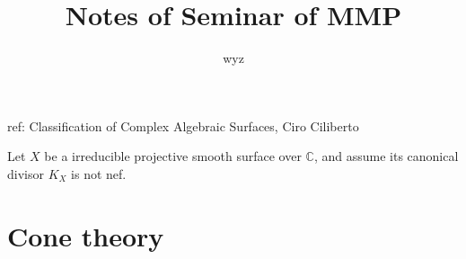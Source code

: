 \documentclass{article}
\title{Notes of Seminar of MMP}
\author{wyz}
\date{}
\begin{document}

ref: Classification of Complex Algebraic Surfaces, Ciro Ciliberto
	
Let $ X $ be a irreducible projective smooth surface over $ \mathbb{C} $, and assume its canonical divisor $ K_X $ is not nef.  
	
	
\section{Cone theory}
\end{document}
